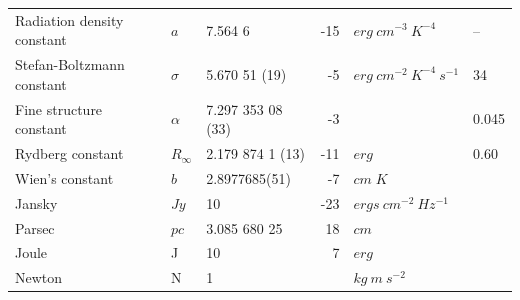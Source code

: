\begin{table}[!ht]
{\begin{tabular}{| l | l | l | r | l | l |}
Radiation density constant & $a$          & 7.564 6           &-15 & $erg\ cm^{-3}\ K^{-4}$ &--    \\
Stefan-Boltzmann constant  & $\sigma$     & 5.670 51 (19)     &-5  & $erg\ cm^{-2}\ K^{-4}\ s^{-1}$ &34    \\
Fine structure constant    & $\alpha$     & 7.297 353 08 (33) &-3  &             &0.045    \\
Rydberg constant           & $R_{\infty}$   & 2.179 874 1 (13)  &-11 & $erg$        &0.60    \\
Wien's constant            & $b$          & 2.8977685(51)   & -7 & $ cm\; K$      & \\
\hline
Jansky                     & $Jy$         & 10               &-23 & $ergs\ cm^{-2}\  Hz^{-1}$  & \\
Parsec                     & $pc$         & 3.085 680 25      &18   & $cm$        &  \\
Joule                      & J            & 10              &7    & $erg$ &  \\
Newton                     & N            & 1               &     & $kg~ m~ s^{-2}$&  \\
\hline
\end{tabular}
\label{table:AGConstantList}
} %
\end{table}


